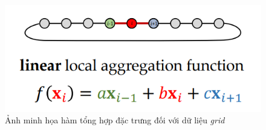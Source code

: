 \begin{figure}[H]
    \centering
    \captionsetup{justification=centering}
    \includegraphics[width=0.7\linewidth]{Images/GDL/graph/grid_agg.png}
    \caption{Ảnh minh họa hàm tổng hợp đặc trưng đối với dữ liệu \textit{grid}\cite{geometricdeep2022}}
\end{figure}



